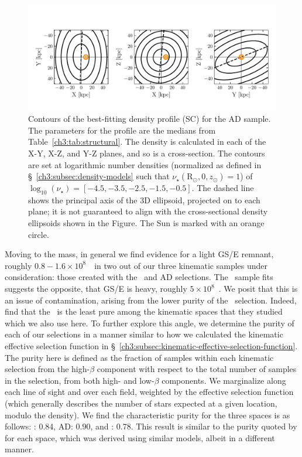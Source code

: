 \begin{figure}
    \centering
    \includegraphics[width=\textwidth]{figure/ch3/contour.pdf}
    \caption{Contours of the best-fitting density profile (SC) for the AD sample. The parameters for the profile are the medians from Table~\ref{ch3:tab:structural}. The density is calculated in each of the X-Y, X-Z, and Y-Z planes, and so is a cross-section. The contours are set at logarithmic number densities (normalized as defined in \S~\ref{ch3:subsec:density-models} such that $\nu_{\star}(\mathrm{R}_{\odot},0,z_{\odot})=1$) of $\log_{10}(\nu_\mathrm{\star}) = [-4.5,-3.5,-2.5,-1.5,-0.5]$. The dashed line shows the principal axis of the 3D ellipsoid, projected on to each plane; it is not guaranteed to align with the cross-sectional density ellipsoids shown in the Figure. The Sun is marked with an orange circle. }
    \label{ch3:fig:pcontour}
\end{figure}

Moving to the mass, in general we find evidence for a light GS/E remnant, roughly $0.8-1.6\times 10^{8}$~\Msun\, in two out of our three kinematic samples under consideration: those created with the \eLz\ and AD selections. The \JRLz\ sample fits suggests the opposite, that GS/E is heavy, roughly $5\times 10^{8}$~\Msun. We posit that this is an issue of contamination, arising from the lower purity of the \JRLz\ selection. Indeed, \cite{lane22} find that the \JRLz\ is the least pure among the kinematic spaces that they studied which we also use here. To further explore this angle, we determine the purity of each of our selections in a manner similar to how we calculated the kinematic effective selection function in \S~\ref{ch3:subsec:kinematic-effective-selection-function}. The purity here is defined as the fraction of samples within each kinematic selection from the high-$\beta$ component with respect to the total number of samples in the selection, from both high- and low-$\beta$ components. We marginalize along each line of sight and over each field, weighted by the effective selection function (which generally describes the number of stars expected at a given location, modulo the density). We find the characteristic purity for the three spaces is as follows: \eLz: 0.84, AD: 0.90, and \JRLz: 0.78. This result is similar to the purity quoted by \cite{lane22} for each space, which was derived using similar models, albeit in a different manner.


